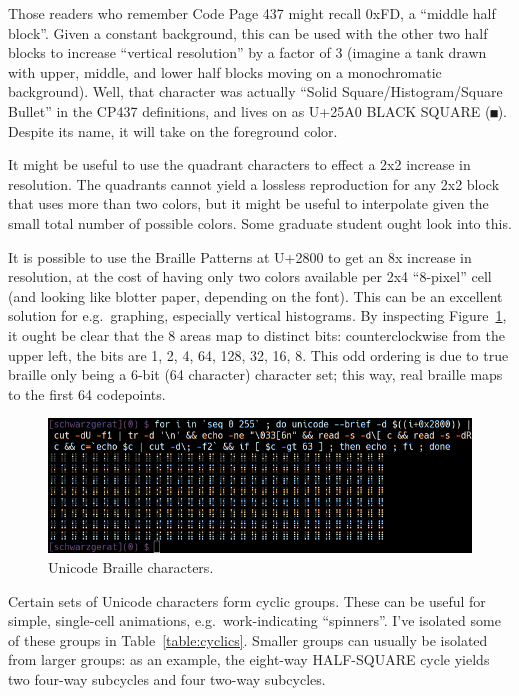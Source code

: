 Those readers who remember Code Page 437 might recall 0xFD, a ``middle half
block''. Given a constant background, this can be used with the other two
half blocks to increase ``vertical resolution'' by a factor of 3 (imagine a
tank drawn with upper, middle, and lower half blocks moving on a monochromatic
background). Well, that character was actually ``Solid Square/Histogram/Square Bullet''
in the CP437 definitions\cite{cp437}, and lives on as U+25A0 BLACK SQUARE (\texttt{■}).
Despite its name, it will take on the foreground color.

It might be useful to use the quadrant characters to effect a 2x2 increase in
resolution. The quadrants cannot yield a lossless reproduction for any 2x2
block that uses more than two colors, but it might be useful to interpolate
given the small total number of possible colors. Some graduate student ought
look into this.

It is possible to use the Braille Patterns at U+2800 to get an 8x increase in
resolution, at the cost of having only two colors available per 2x4 ``8-pixel''
cell (and looking like blotter paper, depending on the font). This can be an
excellent solution for e.g.\ graphing, especially vertical histograms. By
inspecting Figure~\ref{fig:braille}, it ought be clear that the 8 areas
map to distinct bits: counterclockwise from the upper left, the bits are 1, 2,
4, 64, 128, 32, 16, 8. This odd ordering is due to true braille only being a
6-bit (64 character) character set; this way, real braille maps to the first
64 codepoints.

\begin{figure}[!htb]
    \centering
    \includegraphics[width=1\linewidth]{media/braille-unicode.png}
    \caption{Unicode Braille characters.}
    \label{fig:braille}
\end{figure}

Certain sets of Unicode characters form cyclic groups. These can be useful for
simple, single-cell animations, e.g.\ work-indicating ``spinners''. I've isolated
some of these groups in Table~\ref{table:cyclics}. Smaller groups can usually
be isolated from larger groups: as an example, the eight-way HALF-SQUARE cycle
yields two four-way subcycles and four two-way subcycles.

